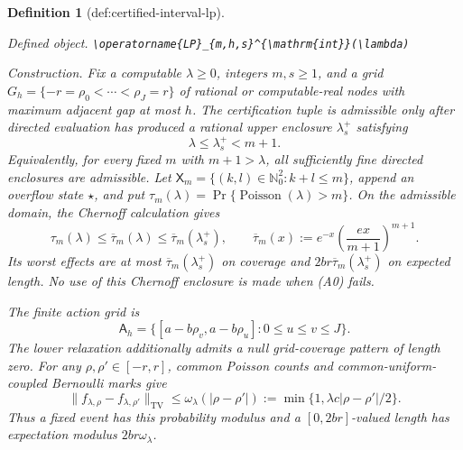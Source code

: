 \documentclass{article}
\newtheorem{definition}{Definition}
\begin{document}
\begin{definition}[def:certified-interval-lp]\label{def:certified-interval-lp}
\par\smallskip\noindent\emph{Defined object.} \texttt{\textbackslash{}\allowbreak{}operatorname\{LP\}\allowbreak{}\_\allowbreak{}\{m,\allowbreak{}h,\allowbreak{}s\}\allowbreak{}\textasciicircum{}\{\textbackslash{}\allowbreak{}mathrm\{int\}\allowbreak{}\}\allowbreak{}(\textbackslash{}\allowbreak{}lambda)}
\par\smallskip\noindent\emph{Construction.} Fix a computable \(\lambda\ge0\), integers \(m,s\ge1\), and a grid
\(G_h=\{-r=\rho_0<\cdots<\rho_J=r\}\) of rational or computable-real
nodes with maximum adjacent gap at most \(h\).  The certification tuple
is admissible only after directed evaluation has produced a rational
upper enclosure \(\lambda_s^+\) satisfying
\[
 \lambda\le\lambda_s^+<m+1.
 \tag{A0}
\]
Equivalently, for every fixed \(m\) with \(m+1>\lambda\), all
sufficiently fine directed enclosures are admissible.  Let
\(\mathsf X_m=\{(k,l)\in\mathbb N_0^2:k+l\le m\}\), append an overflow
state \(\star\), and put
\(\tau_m(\lambda)=\Pr\{\operatorname{Poisson}(\lambda)>m\}\).  On the
admissible domain, the Chernoff calculation gives
\[
 \tau_m(\lambda)\le\overline\tau_m(\lambda)
 \le\overline\tau_m(\lambda_s^+),\qquad
 \overline\tau_m(x):=
 e^{-x}\left(\frac{ex}{m+1}\right)^{m+1}.
 \tag{A1}
\]
Its worst effects are at most
\(\overline\tau_m(\lambda_s^+)\) on coverage and
\(2br\overline\tau_m(\lambda_s^+)\) on expected length.  No use of
this Chernoff enclosure is made when (A0) fails.

The finite action grid is
\[
 \mathsf A_h=\{[a-b\rho_v,a-b\rho_u]:0\le u\le v\le J\}.
\]
The lower relaxation additionally admits a null grid-coverage pattern
of length zero.  For any \(\rho,\rho'\in[-r,r]\), common Poisson counts
and common-uniform-coupled Bernoulli marks give
\[
 \lVert f_{\lambda,\rho}-f_{\lambda,\rho'}\rVert_{\mathrm{TV}}
 \le\omega_\lambda(|\rho-\rho'|)
 :=\min\{1,\lambda c|\rho-\rho'|/2\}.
\]
Thus a fixed event has this probability modulus and a
\([0,2br]\)-valued length has expectation modulus
\(2br\omega_\lambda\).


\end{definition}
\end{document}
